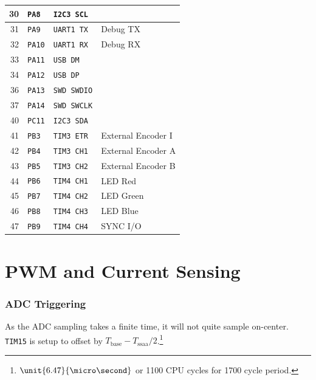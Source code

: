 \documentclass[12pt,a4paper,oneside,openany]{article}
\begin{document}
\begin{longtable}[htbp]{@{}rlll@{}}
\midrule 30 & \texttt{PA8}  &\texttt{I2C3 SCL}  & \\
\midrule 31 & \texttt{PA9}  &\texttt{UART1 TX}  & Debug TX \\
         32 & \texttt{PA10} &\texttt{UART1 RX}  & Debug RX \\
\midrule 33 & \texttt{PA11} &\texttt{USB DM}    & \\
         34 & \texttt{PA12} &\texttt{USB DP}    & \\
\midrule 36 & \texttt{PA13} &\texttt{SWD SWDIO} & \\
         37 & \texttt{PA14} &\texttt{SWD SWCLK} & \\
\midrule 40 & \texttt{PC11} &\texttt{I2C3 SDA}  & \\
\midrule 41 & \texttt{PB3}  &\texttt{TIM3 ETR}  & External Encoder I\\
         42 & \texttt{PB4}  &\texttt{TIM3 CH1}  & External Encoder A\\
         43 & \texttt{PB5}  &\texttt{TIM3 CH2}  & External Encoder B\\
\midrule 44 & \texttt{PB6}  &\texttt{TIM4 CH1}  & LED Red \\
         45 & \texttt{PB7}  &\texttt{TIM4 CH2}  & LED Green \\
         46 & \texttt{PB8}  &\texttt{TIM4 CH3}  & LED Blue \\
         47 & \texttt{PB9}  &\texttt{TIM4 CH4}  & SYNC I/O \\
\end{longtable}

\section{PWM and Current Sensing}


\subsubsection{ADC Triggering}

As the ADC sampling takes a finite time, it will not quite sample on-center. \texttt{TIM15} is setup to offset by $T_{\textrm{base}} - T_{\textrm{ssaa}}/2$.\footnote{$\unit{6.47}{\micro\second}$ or 1100 CPU cycles for 1700 cycle period.}
\end{document}
